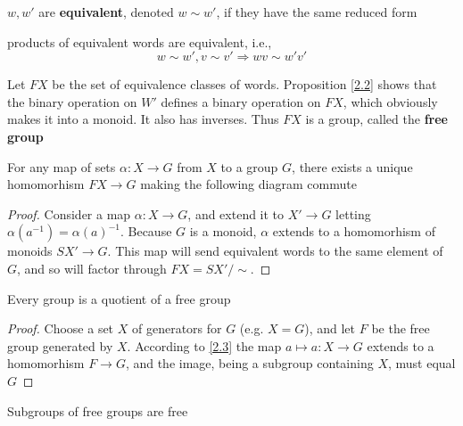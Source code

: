 \documentclass[11pt]{article}
\begin{document}
\(w,w'\) are \textbf{equivalent}, denoted \(w\sim w'\), if they have the same reduced form

\begin{proposition}[]
\label{2.2}
products of equivalent words are equivalent, i.e.,
\begin{equation*}
w\sim w',v\sim v'\Rightarrow wv\sim w'v'
\end{equation*}
\end{proposition}

Let \(FX\) be the set of equivalence classes of words. Proposition \ref{2.2} shows that the binary
operation on \(W'\) defines a binary operation on \(FX\), which obviously makes it into a
monoid. It also has inverses. Thus \(FX\) is a group, called the \textbf{free group}

\begin{proposition}[]
\label{2.3}
For any map of sets \(\alpha:X\to G\) from \(X\) to a group \(G\), there exists a unique
homomorhism \(FX\to G\) making the following diagram commute
\begin{center}\end{center}
\end{proposition}

\begin{proof}
Consider a map \(\alpha:X\to G\), and extend it to \(X'\to G\) letting \(\alpha(a^{-1})=\alpha(a)^{-1}\).
Because \(G\) is a monoid, \(\alpha\) extends to a homomorhism of monoids \(SX'\to G\). This map will send
equivalent words to the same element of \(G\), and so will factor through \(FX=SX'/\sim\).
\end{proof}

\begin{corollary}[]
Every group is a quotient of a free group
\end{corollary}

\begin{proof}
Choose a set \(X\) of generators for \(G\) (e.g. \(X=G\)), and let \(F\) be the free group
generated by \(X\). According to \ref{2.3} the map \(a\mapsto a:X\to G\)  extends to a
homomorhism \(F\to G\), and the image, being a subgroup containing \(X\), must equal \(G\)
\end{proof}

\begin{theorem}
Subgroups of free groups are free
\end{theorem}
\end{document}
